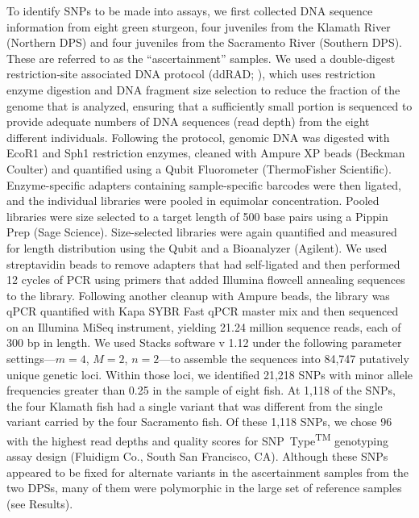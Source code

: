 \documentclass[twocolumn,natbib]{svjour3}       %
\newcommand{\snptype}{SNP~Type\textsuperscript{{\tiny TM}}}
\begin{document}
To identify SNPs to be made into assays, we first collected DNA sequence
information from eight green sturgeon, four juveniles from the Klamath River 
(Northern DPS) and four juveniles from the Sacramento River (Southern DPS). 
These are referred to as the ``ascertainment'' samples. We used a double-digest restriction-site associated
DNA protocol (ddRAD; \citealt{Petersonetal2012}), which uses restriction
enzyme digestion and DNA fragment size selection to reduce the fraction of the
genome that is analyzed, ensuring that a sufficiently small portion is
sequenced to provide adequate numbers of DNA sequences (read depth) from the
eight different individuals. 
Following the \citet{Petersonetal2012} protocol, genomic DNA was digested with EcoR1 and Sph1
restriction enzymes, cleaned with Ampure XP beads (Beckman Coulter) and quantified
using a Qubit Fluorometer (ThermoFisher Scientific). Enzyme-specific adap\-ters
containing sample-specific barcodes were then ligated, and the individual libraries
were pooled in equimolar concentration. Pooled libraries were size selected to a target
length of 500 base pairs using a Pippin Prep (Sage Science). Size-selected
libraries were again quantified and measured for length distribution using the
Qubit and a Bioanalyzer (Agilent). We used streptavidin beads to remove adapters
that had self-ligated and then performed 12 cycles of PCR using primers that
added Illumina flowcell annealing sequences to the library. Following another cleanup
with Ampure beads, the library was qPCR quantified with Kapa SYBR Fast qPCR master mix and
then sequenced on an Illumina MiSeq instrument, yielding 21.24 million sequence reads, 
each of 300 bp in length. We used Stacks software v 1.12 \citep{catchen2011stacks} 
under the following parameter settings---$m = 4$, $M = 2$, $n = 2$---to assemble 
the sequences into 84,747 putatively unique genetic loci. Within those loci, 
we identified 21,218 SNPs with minor allele frequencies greater than 0.25 
in the sample of eight fish. At 1,118 of the SNPs, the four Klamath fish 
had a single variant that was different from the single variant carried by 
the four Sacramento fish. Of these 1,118 SNPs, we chose 96 with the highest 
read depths and quality scores for \snptype{} genotyping assay design 
(Fluidigm Co., South San Francisco, CA). Although these SNPs appeared
to be fixed for alternate variants in the ascertainment samples from the 
two DPSs, many of them were polymorphic in the large set of reference samples (see Results).
\end{document}
